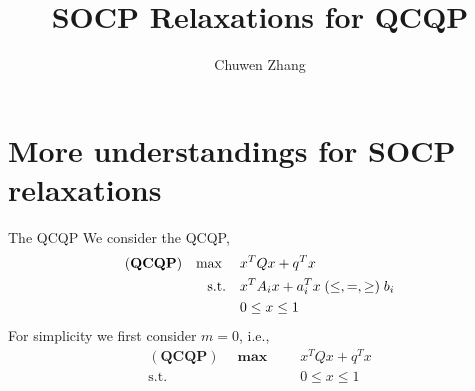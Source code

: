 \documentclass[aspectratio=1610, 10pt]{beamer}
\newcommand{\model}[1]{(\textbf{#1})}
\newcommand{\mx}{\mathbf{\max}\;}
\begin{document}
\title{SOCP Relaxations for QCQP}

\author{
  Chuwen Zhang
}


\maketitle

\section{More understandings for SOCP relaxations}

\begin{frame}{The QCQP}
  We consider the QCQP,
  \begin{equation}
    \label{eq:inhoqcqp}
    \begin{aligned}
      \model{QCQP} \quad \mx \quad & x^T Qx + q^T x                                    \\
      \textrm{s.t.} \quad          & x^T A_i x + a_i^T x \hspace{0.27em} (\le, =, \ge)
      \hspace{0.27em} b_i                                                              \\
                                   & 0 \le x \le 1
    \end{aligned}
  \end{equation}
  For simplicity we first consider \(m = 0\), i.e.,
  \begin{equation}
    \label{eq:inhoqcqp.box}
    \begin{aligned}
      \model{QCQP} \quad \mx \quad & x^T Qx + q^T x \\
      \textrm{s.t.} \quad          & 0 \le x \le 1
    \end{aligned}
  \end{equation}
\end{frame}
\end{document}
